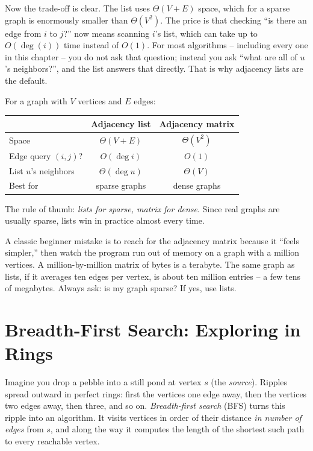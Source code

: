 Now the trade-off is clear. The list uses $\Theta(V + E)$ space, which for a
sparse graph is enormously smaller than $\Theta(V^2)$. The price is that
checking ``is there an edge from $i$ to $j$?'' now means scanning $i$'s list,
which can take up to $O(\deg(i))$ time instead of $O(1)$. For most algorithms --
including every one in this chapter -- you do not ask that question; instead you
ask ``what are all of $u$'s neighbors?'', and the list answers that directly. That is why adjacency lists are the default.

\begin{complexitybox}
For a graph with $V$ vertices and $E$ edges:
\begin{center}
\begin{tabular}{lcc}
\toprule
 & Adjacency list & Adjacency matrix \\
\midrule
Space               & $\Theta(V+E)$ & $\Theta(V^2)$ \\
Edge query $(i,j)$? & $O(\deg i)$   & $O(1)$ \\
List $u$'s neighbors& $\Theta(\deg u)$ & $\Theta(V)$ \\
Best for            & sparse graphs & dense graphs \\
\bottomrule
\end{tabular}
\end{center}
The rule of thumb: \emph{lists for sparse, matrix for dense}. Since real graphs
are usually sparse, lists win in practice almost every time.
\end{complexitybox}

\begin{trapbox}
A classic beginner mistake is to reach for the adjacency matrix because it
``feels simpler,'' then watch the program run out of memory on a graph with a
million vertices. A million-by-million matrix of bytes is a terabyte. The same
graph as lists, if it averages ten edges per vertex, is about ten million
entries -- a few tens of megabytes. Always ask: is my graph sparse? If yes, use
lists.
\end{trapbox}

\section{Breadth-First Search: Exploring in Rings}
\label{ch22:bfs}

Imagine you drop a pebble into a still pond at vertex $s$ (the \emph{source}).
Ripples spread outward in perfect rings: first the vertices one edge away, then
the vertices two edges away, then three, and so on. \emph{Breadth-first search}
(BFS) turns this ripple into an algorithm. It visits vertices in
order of their distance \emph{in number of edges} from $s$, and along the way
it computes the length of the shortest such path to every reachable vertex.

